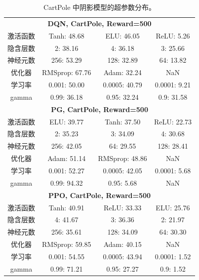 \begin{table}[!ht]
    \centering
    \footnotesize
    \caption{CartPole 中阴影模型的超参数分布。}
    \label{cartpole-reward500-hyperparameter-ratio}
    \begin{tabular}{cccc}
    \toprule
    \multicolumn{4}{c}{\multirow{2}{*}{\textbf{DQN, CartPole, Reward=500}}}  \\
    \multicolumn{4}{c}{}
    \\ \toprule
    激活函数     & Tanh: 48.68    & ELU: 46.05     & ReLU: 5.26   \\
    隐含层数 & 2: 38.16       & 4: 36.18       & 3: 25.66     \\
    神经元数 & 256: 53.29     & 128: 32.89     & 64: 13.82    \\
    优化器      & RMSprop: 67.76 & Adam: 32.24    & NaN          \\
    学习率 & 0.001: 50.00   & 0.0005: 40.79  & 0.0001: 9.21 \\
    gamma          & 0.99: 36.18    & 0.95: 32.24    & 0.9: 31.58   \\ \toprule
    \multicolumn{4}{c}{\multirow{2}{*}{\textbf{PG, CartPole, Reward=500}}}   \\
    \multicolumn{4}{c}{} 
    \\ \toprule
    激活函数     & ELU: 39.77     & Tanh: 37.50    & ReLU: 22.73  \\
    隐含层数 & 2: 35.23       & 3: 34.09       & 4: 30.68     \\
    神经元数 & 256: 42.05     & 64: 29.55      & 128: 28.41   \\
    优化器      & Adam: 51.14    & RMSprop: 48.86 & NaN          \\
    学习率 & 0.001: 52.27   & 0.0005: 42.05  & 0.0001: 5.68 \\
    gamma          & 0.99: 94.32    & 0.95: 5.68     & NaN          \\ \toprule
    \multicolumn{4}{c}{\multirow{2}{*}{\textbf{PPO, CartPole, Reward=500}}}   \\
    \multicolumn{4}{c}{}
    \\ \toprule
    激活函数     & Tanh: 40.91    & ReLU: 33.33    & ELU: 25.76   \\
    隐含层数 & 4: 41.67       & 3: 36.36       & 2: 21.97     \\
    神经元数 & 256: 35.61     & 128: 34.09     & 64: 30.30    \\
    优化器      & RMSprop: 59.85 & Adam: 40.15    & NaN          \\
    学习率 & 0.001: 54.55   & 0.0005: 43.94  & 0.0001: 1.52 \\
    gamma          & 0.99: 71.21    & 0.95: 27.27    & 0.9: 1.52    \\ \bottomrule
    \end{tabular}
\end{table}

